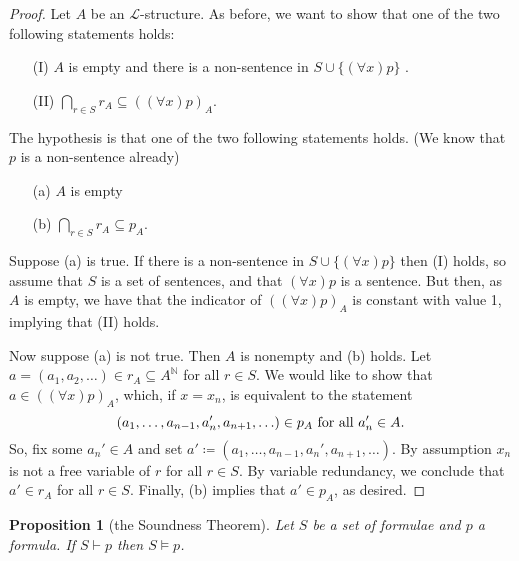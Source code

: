 \documentclass{report}
\theoremstyle{definition}
\theoremstyle{plain}
\newtheorem{prop}[thm]{Proposition}
\theoremstyle{definition}
\begin{document}
	\begin{proof}
		Let $A$ be an $\mathcal{L}$-structure. As before, we want to show that one of the two following statements holds:
		\begin{enumerate}
			\item[(I)] $A$ is empty and there is a non-sentence in $S\cup \{(\forall x) p\}$ .
			\item[(II)] $\bigcap_{r\in S} r_A \subseteq ((\forall x)p)_A$.
		\end{enumerate}
		The hypothesis is that one of the two following statements holds. (We know that $p$ is a non-sentence already)
		\begin{enumerate}
			\item[(a)] $A$ is empty
			\item[(b)] $\bigcap_{r\in S} r_A \subseteq p_A$.
		\end{enumerate}
		Suppose (a) is true. If there is a non-sentence in $S\cup \{(\forall x) p\}$ then (I) holds, so assume that $S$ is a set of sentences, and that $(\forall x) p$ is a sentence. But then, as $A$ is empty, we have that the indicator of $((\forall x) p)_A$ is constant with value 1, implying that (II) holds.
		
		Now suppose (a) is not true. Then $A$ is nonempty and (b) holds. Let $a= (a_1,a_2,\ldots)\in r_A\subseteq A^{\mathbb{N}}$ for all $r\in S$.  We would like to show that $a\in ((\forall x)p)_A$, which, if $x= x_n$, is equivalent to the statement
		\[
		(a_1,\ldots, a_{n-1},a_n',a_{n+1},\ldots) \in p_A \textnormal{ for all }a_n'\in A.
		\]
		So, fix some $a_n'\in A$ and set $a' \coloneqq (a_1,\ldots, a_{n-1},a_n',a_{n+1},\ldots)$. By assumption $x_n$ is not a free variable of $r$ for all $r\in S$. By variable redundancy, we conclude that $a'\in r_A$ for all $r\in S$. Finally, (b) implies that $a'\in p_A$, as desired. 
	\end{proof}
	\begin{prop}[the Soundness Theorem]
		Let $S$ be a set of formulae and $p$ a formula. If $S\vdash p$ then $S\models p$.
	\end{prop}
\end{document}

